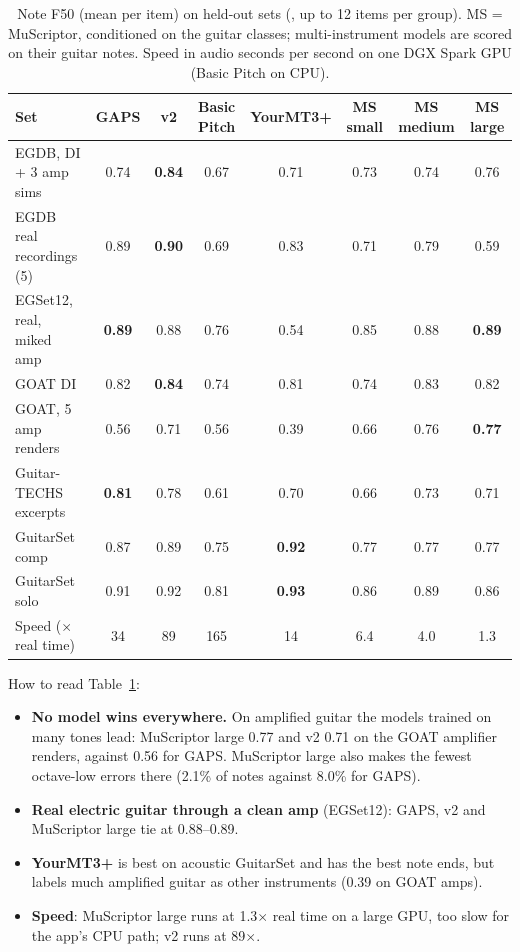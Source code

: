 \begin{table}[h]
\centering
\caption{Note F50 (mean per item) on held-out sets \measured{}
(, up to 12 items per group). MS = MuScriptor, conditioned
on the guitar classes; multi-instrument models are scored on their guitar
notes. Speed in audio seconds per second on one DGX Spark GPU (Basic Pitch on
CPU).}
\label{tab:bench-notes}
\footnotesize
\setlength{\tabcolsep}{4pt}
\begin{tabular}{@{}lccccccc@{}}
\toprule
Set & GAPS & v2 & Basic Pitch & YourMT3+ & MS small & MS medium & MS large \\
\midrule
EGDB, DI + 3 amp sims & 0.74 & \textbf{0.84} & 0.67 & 0.71 & 0.73 & 0.74 & 0.76 \\
EGDB real recordings (5) & 0.89 & \textbf{0.90} & 0.69 & 0.83 & 0.71 & 0.79 & 0.59 \\
EGSet12, real, miked amp & \textbf{0.89} & 0.88 & 0.76 & 0.54 & 0.85 & 0.88 & \textbf{0.89} \\
GOAT DI & 0.82 & \textbf{0.84} & 0.74 & 0.81 & 0.74 & 0.83 & 0.82 \\
GOAT, 5 amp renders & 0.56 & 0.71 & 0.56 & 0.39 & 0.66 & 0.76 & \textbf{0.77} \\
Guitar-TECHS excerpts & \textbf{0.81} & 0.78 & 0.61 & 0.70 & 0.66 & 0.73 & 0.71 \\
GuitarSet comp & 0.87 & 0.89 & 0.75 & \textbf{0.92} & 0.77 & 0.77 & 0.77 \\
GuitarSet solo & 0.91 & 0.92 & 0.81 & \textbf{0.93} & 0.86 & 0.89 & 0.86 \\
\midrule
Speed ($\times$ real time) & 34 & 89 & 165 & 14 & 6.4 & 4.0 & 1.3 \\
\bottomrule
\end{tabular}
\end{table}

How to read Table~\ref{tab:bench-notes}:
\begin{itemize}
\item \textbf{No model wins everywhere.} On amplified guitar the models trained
  on many tones lead: MuScriptor large 0.77 and v2 0.71 on the GOAT amplifier
  renders, against 0.56 for GAPS. MuScriptor large also makes the fewest
  octave-low errors there (2.1\% of notes against 8.0\% for GAPS).
\item \textbf{Real electric guitar through a clean amp} (EGSet12): GAPS, v2 and
  MuScriptor large tie at 0.88--0.89.
\item \textbf{YourMT3+} is best on acoustic GuitarSet and has the best note
  ends, but labels much amplified guitar as other instruments (0.39 on GOAT
  amps).
\item \textbf{Speed}: MuScriptor large runs at 1.3$\times$ real time on a large
  GPU, too slow for the app's CPU path; v2 runs at 89$\times$.
\end{itemize}

